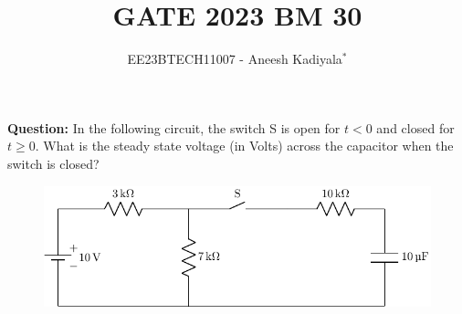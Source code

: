 \documentclass[journal,12pt,twocolumn]{IEEEtran}
\theoremstyle{remark}
\begin{document}

\vspace{3cm}

\title{GATE 2023 BM 30}
\author{EE23BTECH11007 - Aneesh Kadiyala$^{*}$%
}
\maketitle
\newpage
\bigskip

\renewcommand{\thefigure}{\theenumi}
\renewcommand{\thetable}{\theenumi}

\vspace{3cm}
\textbf{Question:} In the following circuit, the switch S is open for $t < 0$ and closed for $t \ge 0$.
What is the steady state voltage (in Volts) across the capacitor when the switch is closed?
\begin{figure}[h!]
    \centering
    \includegraphics[width = \columnwidth]{figs/c_fig1.pdf}
\end{figure}
\\
\solution
\\
\end{document}
